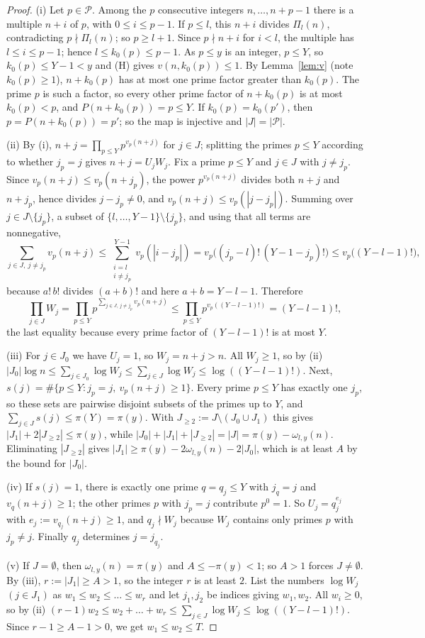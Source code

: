 \documentclass[10pt]{article}
\numberwithin{equation}{section}
\theoremstyle{definition}
\theoremstyle{plain}
\newcommand{\cP}{\mathcal{P}}
\begin{document}
\begin{proof}
(i) Let $p\in\cP$. Among the $p$ consecutive integers $n,\dots,n+p-1$ there is a multiple $n+i$ of $p$, with
$0\le i\le p-1$. If $p\le l$, this $n+i$ divides $\Pi_l(n)$, contradicting $p\nmid\Pi_l(n)$; so $p\ge l+1$.
Since $p\nmid n+i$ for $i<l$, the multiple has $l\le i\le p-1$; hence $l\le k_0(p)\le p-1$. As $p\le y$ is an
integer, $p\le Y$, so $k_0(p)\le Y-1<y$ and (H) gives $v(n,k_0(p))\le1$. By Lemma~\ref{lem:v} (note
$k_0(p)\ge1$), $n+k_0(p)$ has at most one prime factor greater than $k_0(p)$. The prime $p$ is such a factor, so
every other prime factor of $n+k_0(p)$ is at most $k_0(p)<p$, and $P(n+k_0(p))=p\le Y$. If $k_0(p)=k_0(p')$, then
$p=P(n+k_0(p))=p'$; so the map is injective and $|J|=|\cP|$.

(ii) By (i), $n+j=\prod_{p\le Y}p^{v_p(n+j)}$ for $j\in J$; splitting the primes $p\le Y$ according to whether
$j_p=j$ gives $n+j=U_jW_j$. Fix a prime $p\le Y$ and $j\in J$ with $j\ne j_p$. Since
$v_p(n+j)\le v_p(n+j_p)$, the power $p^{v_p(n+j)}$ divides both $n+j$ and $n+j_p$, hence divides
$j-j_p\ne0$, and $v_p(n+j)\le v_p(|j-j_p|)$. Summing over $j\in J\setminus\{j_p\}$, a subset of
$\{l,\dots,Y-1\}\setminus\{j_p\}$, and using that all terms are nonnegative,
\[
\sum_{j\in J,\ j\ne j_p}v_p(n+j)\le\sum_{\substack{i=l\\ i\ne j_p}}^{Y-1}v_p(|i-j_p|)
=v_p\bigl((j_p-l)!\,(Y-1-j_p)!\bigr)\le v_p\bigl((Y-l-1)!\bigr),
\]
because $a!\,b!$ divides $(a+b)!$ and here $a+b=Y-l-1$. Therefore
\[
\prod_{j\in J}W_j=\prod_{p\le Y}p^{\sum_{j\in J,\,j\ne j_p}v_p(n+j)}\le\prod_{p\le Y}p^{v_p((Y-l-1)!)}=(Y-l-1)!,
\]
the last equality because every prime factor of $(Y-l-1)!$ is at most $Y$.

(iii) For $j\in J_0$ we have $U_j=1$, so $W_j=n+j>n$. All $W_j\ge1$, so by (ii)
$|J_0|\log n\le\sum_{j\in J_0}\log W_j\le\sum_{j\in J}\log W_j\le\log((Y-l-1)!)$. Next,
$s(j)=\#\{p\le Y: j_p=j,\ v_p(n+j)\ge1\}$. Every prime $p\le Y$ has exactly one $j_p$, so these sets are
pairwise disjoint subsets of the primes up to $Y$, and $\sum_{j\in J}s(j)\le\pi(Y)=\pi(y)$. With
$J_{\ge2}:=J\setminus(J_0\cup J_1)$ this gives $|J_1|+2|J_{\ge2}|\le\pi(y)$, while
$|J_0|+|J_1|+|J_{\ge2}|=|J|=\pi(y)-\omega_{l,y}(n)$. Eliminating $|J_{\ge2}|$ gives
$|J_1|\ge\pi(y)-2\omega_{l,y}(n)-2|J_0|$, which is at least $A$ by the bound for $|J_0|$.

(iv) If $s(j)=1$, there is exactly one prime $q=q_j\le Y$ with $j_q=j$ and $v_q(n+j)\ge1$; the other primes $p$
with $j_p=j$ contribute $p^0=1$. So $U_j=q_j^{e_j}$ with $e_j:=v_{q_j}(n+j)\ge1$, and $q_j\nmid W_j$ because
$W_j$ contains only primes $p$ with $j_p\ne j$. Finally $q_j$ determines $j=j_{q_j}$.

(v) If $J=\emptyset$, then $\omega_{l,y}(n)=\pi(y)$ and $A\le-\pi(y)<1$; so $A>1$ forces $J\ne\emptyset$. By (iii),
$r:=|J_1|\ge A>1$, so the integer $r$ is at least $2$. List the numbers $\log W_j$ $(j\in J_1)$ as
$w_1\le w_2\le\dots\le w_r$ and let $j_1,j_2$ be indices giving $w_1,w_2$. All $w_i\ge0$, so by (ii)
$(r-1)w_2\le w_2+\dots+w_r\le\sum_{j\in J}\log W_j\le\log((Y-l-1)!)$. Since $r-1\ge A-1>0$, we get
$w_1\le w_2\le T$.
\end{proof}
\end{document}
